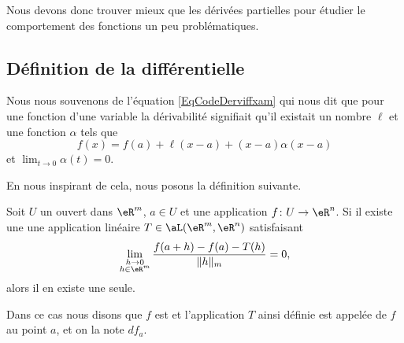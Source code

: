 Nous devons donc trouver mieux que les dérivées partielles pour étudier le comportement des fonctions un peu problématiques.

\subsection{Définition de la différentielle}

Nous nous souvenons de l'équation \eqref{EqCodeDerviffxam} qui nous dit que pour une fonction d'une variable la dérivabilité signifiait qu'il existait un nombre $\ell$ et une fonction $\alpha$ tels que
\begin{equation}
    f(x)=f(a)+\ell(x-a)+(x-a)\alpha(x-a)
\end{equation}
et $\lim_{t\to 0} \alpha(t)=0$. 

En nous inspirant de cela, nous posons la définition suivante.

\begin{propositionDef}      \label{DefDifferentiellePta}
  Soit $U$ un ouvert dans $\eR^m$, $a\in U$ et une application \( f\colon U\to \eR^n\). Si il existe une une application linéaire \( T\in\aL(\eR^m,\eR^n)\) satisfaisant
  \begin{equation}	\label{EqCritereDefDiff}
      \lim_{\substack{h\to 0\\h\in \eR^m}}\frac{f(a+h)-f(a)-T(h)}{\|h\|_m}=0,
  \end{equation}
  alors il en existe une seule.

  Dans ce cas nous disons que $f$ est  et l'application $T$ ainsi définie est appelée  de $f$ au point $a$, et on la note $df_a$. 
\end{propositionDef}

